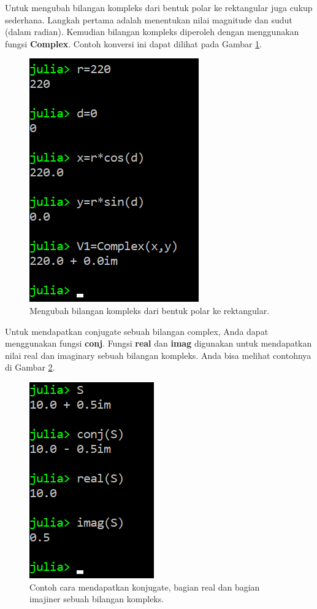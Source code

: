 \documentclass[12pt,a4paper]{memoir}
\begin{document}
	Untuk mengubah bilangan kompleks dari bentuk polar ke rektangular juga cukup sederhana. Langkah pertama adalah menentukan nilai magnitude dan sudut (dalam radian). Kemudian bilangan kompleks diperoleh dengan menggunakan fungsi \textbf{Complex}. Contoh konversi ini dapat dilihat pada Gambar \ref{fig:complexnumber3}.
	
\begin{figure}
	\centering
	\includegraphics[width=0.35\linewidth]{images/complexnumber3}
	\caption{Mengubah bilangan kompleks dari bentuk polar ke rektangular.}
	\label{fig:complexnumber3}
\end{figure}

	Untuk mendapatkan conjugate sebuah bilangan complex, Anda dapat menggunakan fungsi \textbf{conj}. Fungsi \textbf{real} dan \textbf{imag} digunakan untuk mendapatkan nilai real dan imaginary sebuah bilangan kompleks. Anda bisa melihat contohnya di Gambar \ref{fig:complexnumber4}.
	
	\begin{figure}
		\centering
		\includegraphics[width=0.4\linewidth]{images/complexnumber4}
		\caption{Contoh cara mendapatkan konjugate, bagian real dan bagian imajiner sebuah bilangan kompleks.}
		\label{fig:complexnumber4}
	\end{figure}
\end{document}
